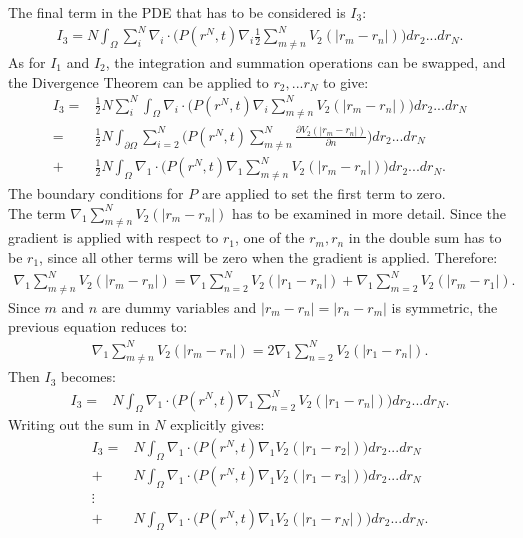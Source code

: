 The final term in the PDE that has to be considered is $I_3$:
\begin{align*}
I_3 = N\int_\Omega \sum_{i}^N \nabla_i \cdot \bigg( P(r^N,t)\nabla_i \frac{1}{2} \sum_{m \neq n}^N V_2(|r_m - r_n|) \bigg) dr_2...dr_N.
\end{align*}
As for $I_1$ and $I_2$, the integration and summation operations can be swapped, and the Divergence Theorem can be applied to $r_2,...r_N$ to give:
\begin{align*}
I_3 =& \frac{1}{2}N \sum_{i}^N \int_\Omega  \nabla_i \cdot \bigg( P(r^N,t) \nabla_i \sum_{m \neq n}^N V_2(|r_m - r_n|) \bigg) dr_2...dr_N\\
=&\frac{1}{2}N\int_{\partial \Omega} \sum_{i=2}^N  \bigg( P(r^N,t) \sum_{m \neq n}^N \frac{ \partial V_2(|r_m - r_n|)}{\partial n} \bigg) dr_2...dr_N\\
 +& \frac{1}{2}N\int_\Omega  \nabla_1 \cdot \bigg( P(r^N,t)\nabla_1 \sum_{m \neq n}^N  V_2(|r_m - r_n|) \bigg) dr_2...dr_N.
\end{align*}
The boundary conditions for $P$ are applied to set the first term to zero. \\
The term $\nabla_1 \sum_{m \neq n}^N  V_2(|r_m - r_n|)$ has to be examined in more detail. Since the gradient is applied with respect to $r_1$, one of the $r_m,r_n$ in the double sum has to be $r_1$, since all other terms will be zero when the gradient is applied.
Therefore:
\begin{align*}
\nabla_1 \sum_{m \neq n}^N  V_2(|r_m - r_n|)=\nabla_1 \sum_{n=2}^N  V_2(|r_1 - r_n|) + \nabla_1 \sum_{m=2}^N  V_2(|r_m - r_1|).
\end{align*}
 Since $m$ and $n$ are dummy variables and  $|r_m - r_n|=|r_n - r_m|$ is symmetric, the previous equation reduces to:
 \begin{align*}
 \nabla_1 \sum_{m \neq n}^N  V_2(|r_m - r_n|)=2 \nabla_1 \sum_{n=2}^N  V_2(|r_1 - r_n|) .
 \end{align*} 
Then $I_3$ becomes:
\begin{align*}
I_3 
=& N\int_\Omega  \nabla_1 \cdot \bigg( P(r^N,t)\nabla_1 \sum_{n=2}^N  V_2(|r_1 - r_n|) \bigg) dr_2...dr_N.
\end{align*}
Writing out the sum in $N$ explicitly gives:
\begin{align*}
I_3 
=& N\int_\Omega  \nabla_1 \cdot \bigg( P(r^N,t)\nabla_1 V_2(|r_1 - r_2|) \bigg) dr_2...dr_N\\
+& N\int_\Omega  \nabla_1 \cdot \bigg( P(r^N,t)\nabla_1 V_2(|r_1 - r_3|) \bigg) dr_2...dr_N\\
\vdots \\
+& N\int_\Omega  \nabla_1 \cdot \bigg( P(r^N,t)\nabla_1 V_2(|r_1 - r_N|) \bigg) dr_2...dr_N.
\end{align*}
